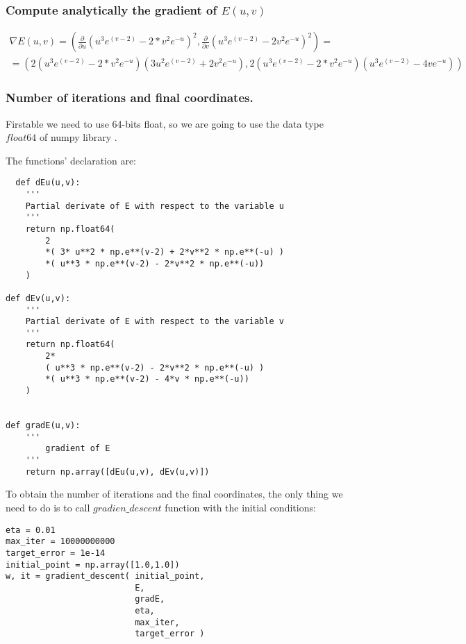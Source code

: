 \subsubsection{Compute analytically the gradient of $E(u,v)$}


\begin{multline*}
  \nabla E(u,v) = \left( \frac{\partial}{\partial u}(u^3 e^{(v-2)} - 2* v^2 e^{-u})^2 , \frac{\partial}{\partial v} (u^3 e^{(v-2)} - 2 v^2 e^{-u})^2 \right) = \\
 =  \left(2(u^3 e^{(v-2)} - 2* v^2 e^{-u})(3u^2e^{(v-2)} + 2 v^2 e^{-u} ), 2(u^3 e^{(v-2)} - 2* v^2 e^{-u})(u^3 e^{(v-2)} - 4 v e^{-u}) \right)
\end{multline*}


\subsubsection{Number of iterations and final coordinates.}

Firstable we need to use 64-bits float, so we are going to use the data type $float64$ of numpy library \cite{float64}.

The functions' declaration are:

\begin{verbatim}
  def dEu(u,v):
    '''
    Partial derivate of E with respect to the variable u
    '''
    return np.float64(
        2
        *( 3* u**2 * np.e**(v-2) + 2*v**2 * np.e**(-u) )
        *( u**3 * np.e**(v-2) - 2*v**2 * np.e**(-u))
    )
    
def dEv(u,v):
    '''
    Partial derivate of E with respect to the variable v
    '''
    return np.float64(
        2*
        ( u**3 * np.e**(v-2) - 2*v**2 * np.e**(-u) )
        *( u**3 * np.e**(v-2) - 4*v * np.e**(-u))
    )


def gradE(u,v):
    ''' 
        gradient of E
    '''
    return np.array([dEu(u,v), dEv(u,v)])

\end{verbatim}

To obtain the number of iterations and the final coordinates, the only thing we need to do is to call $gradien\_descent$ function with the initial conditions:

\begin{verbatim}
eta = 0.01 
max_iter = 10000000000
target_error = 1e-14
initial_point = np.array([1.0,1.0])
w, it = gradient_descent( initial_point,
                          E,
                          gradE,
                          eta,
                          max_iter,
                          target_error )
\end{verbatim}

